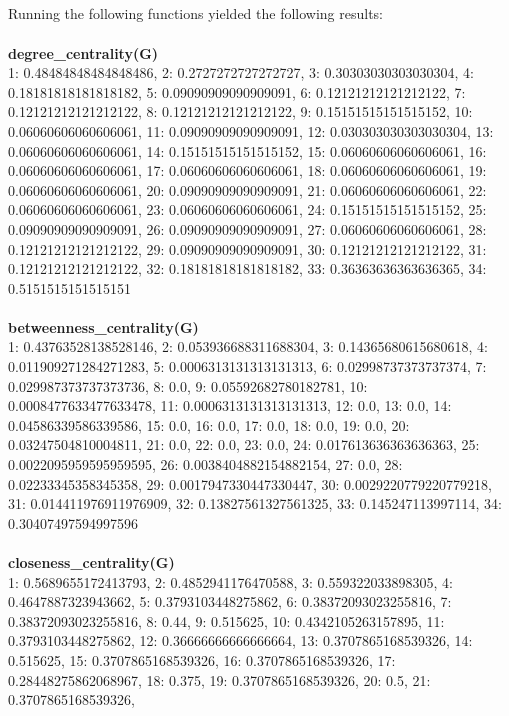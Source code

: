 \documentclass[11pt]{article}
\begin{document}
\subsection{}
Running the following functions yielded the following results:\\
\\
\textbf{degree\_centrality(G)}\\
1: 0.48484848484848486, 2: 0.2727272727272727, 3: 0.30303030303030304,
4: 0.18181818181818182, 5: 0.09090909090909091, 6: 0.12121212121212122,
7: 0.12121212121212122, 8: 0.12121212121212122, 9: 0.15151515151515152,
10: 0.06060606060606061, 11: 0.09090909090909091, 12: 0.030303030303030304,
13: 0.06060606060606061, 14: 0.15151515151515152, 15: 0.06060606060606061,
16: 0.06060606060606061, 17: 0.06060606060606061, 18: 0.06060606060606061,
19: 0.06060606060606061, 20: 0.09090909090909091, 21: 0.06060606060606061,
22: 0.06060606060606061, 23: 0.06060606060606061, 24: 0.15151515151515152,
25: 0.09090909090909091, 26: 0.09090909090909091, 27: 0.06060606060606061,
28: 0.12121212121212122, 29: 0.09090909090909091, 30: 0.12121212121212122,
31: 0.12121212121212122, 32: 0.18181818181818182, 33: 0.36363636363636365,
34: 0.5151515151515151
\\\\
\textbf{betweenness\_centrality(G)}\\
1: 0.43763528138528146, 2: 0.053936688311688304, 3: 0.14365680615680618,
4: 0.011909271284271283, 5: 0.0006313131313131313, 6: 0.02998737373737374,
7: 0.029987373737373736, 8: 0.0, 9: 0.05592682780182781, 10: 0.0008477633477633478,
11: 0.0006313131313131313, 12: 0.0, 13: 0.0, 14: 0.04586339586339586, 15: 0.0,
16: 0.0, 17: 0.0, 18: 0.0, 19: 0.0, 20: 0.03247504810004811, 21: 0.0, 22: 0.0,
23: 0.0, 24: 0.017613636363636363, 25: 0.0022095959595959595, 26: 0.0038404882154882154,
27: 0.0, 28: 0.02233345358345358, 29: 0.0017947330447330447, 30: 0.0029220779220779218,
31: 0.014411976911976909, 32: 0.13827561327561325, 33: 0.145247113997114, 34: 0.30407497594997596
\\\\
\textbf{closeness\_centrality(G)}\\
1: 0.5689655172413793, 2: 0.4852941176470588, 3: 0.559322033898305,
4: 0.4647887323943662, 5: 0.3793103448275862, 6: 0.38372093023255816,
7: 0.38372093023255816, 8: 0.44, 9: 0.515625, 10: 0.4342105263157895,
11: 0.3793103448275862, 12: 0.36666666666666664, 13: 0.3707865168539326,
14: 0.515625, 15: 0.3707865168539326, 16: 0.3707865168539326, 17: 0.28448275862068967,
18: 0.375, 19: 0.3707865168539326, 20: 0.5, 21: 0.3707865168539326,
\end{document}
